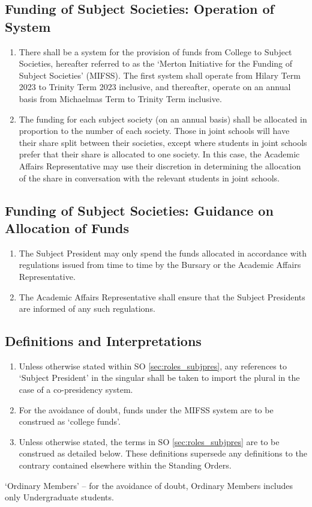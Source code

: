 \subsection{Funding of Subject Societies: Operation of System} \label{ssec:roles_subjpres_funding}
\begin{enumerate}
    \item There shall be a system for the provision of funds from College to Subject Societies, hereafter referred to as the `Merton Initiative for the Funding of Subject Societies' (MIFSS). The first system shall operate from Hilary Term 2023 to Trinity Term 2023 inclusive, and thereafter, operate on an annual basis from Michaelmas Term to Trinity Term inclusive.
    \item The funding for each subject society (on an annual basis) shall be allocated in proportion to the number of each society. Those in joint schools will have their share split between their societies, except where students in joint schools prefer that their share is allocated to one society. In this case, the Academic Affairs Representative may use their discretion in determining the allocation of the share in conversation with the relevant students in joint schools.
\end{enumerate}
\subsection{Funding of Subject Societies: Guidance on Allocation of Funds} \label{ssec:roles_subjpres_fundingguidance}
\begin{enumerate}
    \item The Subject President may only spend the funds allocated in accordance with regulations issued from time to time by the Bursary or the Academic Affairs Representative.
    \item The Academic Affairs Representative shall ensure that the Subject Presidents are informed of any such regulations.
\end{enumerate}
\subsection{Definitions and Interpretations}
\begin{enumerate}
    \item Unless otherwise stated within SO \ref{sec:roles_subjpres}, any references to `Subject President' in the singular shall be taken to import the plural in the case of a co-presidency system.
    \item For the avoidance of doubt, funds under the MIFSS system are to be construed as `college funds'.
    \item Unless otherwise stated, the terms in SO \ref{sec:roles_subjpres} are to be construed as detailed below. These definitions supersede any definitions to the contrary contained elsewhere within the Standing Orders.
\end{enumerate}
`Ordinary Members' – for the avoidance of doubt, Ordinary Members includes only Undergraduate students.

